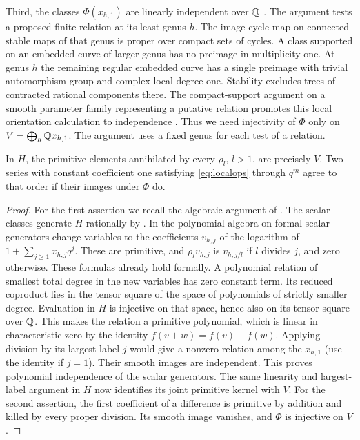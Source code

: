 Third, the classes $\Phi(x_{h,1})$ are linearly independent over $\mathbb Q$
\cite[Theorem~5.1]{WueProduct}. The argument tests a proposed finite
relation at its least genus $h$. The image-cycle map on connected stable
maps of that genus is proper over compact sets of cycles. A class supported
on an embedded curve of larger genus has no preimage in multiplicity one.
At genus $h$ the remaining regular embedded curve has a single preimage
with trivial automorphism group and complex local degree one. Stability
excludes trees of contracted rational components there. The
compact-support argument on a smooth parameter family representing a
putative relation promotes this local orientation calculation to
independence \cite[Lemmas~5.2--5.3 and Proposition~6.1]{WueProduct}.
Thus we need injectivity of $\Phi$ only on
$V=\bigoplus_h\mathbb Q x_{h,1}$. The argument uses a fixed genus for each
test of a relation.

\begin{lemma}\label{lem:detect}
In $H$, the primitive elements annihilated by every $\rho_l$, $l>1$,
are precisely $V$. Two series with constant coefficient one satisfying
\eqref{eq:localops} through $q^m$ agree to that order if their
images under $\Phi$ do.
\end{lemma}
\begin{proof}
For the first assertion we recall the algebraic argument of
\cite[Lemma~7.1]{WueProduct}. The scalar classes generate $H$ rationally
by \cite[Theorem~6.13]{Pardon}. In the polynomial algebra on formal
scalar generators change variables to the coefficients $v_{h,j}$ of
the logarithm of $1+\sum_{j\ge1}x_{h,j}q^j$. These are primitive, and
$\rho_l v_{h,j}$ is $v_{h,j/l}$ if $l$ divides $j$, and zero otherwise.
These formulas already hold formally. A polynomial relation of smallest
total degree in the new variables has zero constant term. Its reduced
coproduct lies in the tensor square of the space of polynomials of
strictly smaller degree. Evaluation in $H$ is injective on that space,
hence also on its tensor square over $\mathbb Q$. This makes the relation a
primitive polynomial, which is linear in characteristic zero by the
identity $f(v+w)=f(v)+f(w)$. Applying division by its largest label
$j$ would give a nonzero relation among the $x_{h,1}$ (use the identity
if $j=1$). Their smooth images are independent. This proves polynomial
independence of the scalar generators. The same linearity and largest-label
argument in $H$ now identifies its joint primitive kernel with $V$.
For the second assertion, the first coefficient of a difference is
primitive by addition and killed by every proper division. Its smooth
image vanishes, and $\Phi$ is injective on $V$.
\end{proof}
